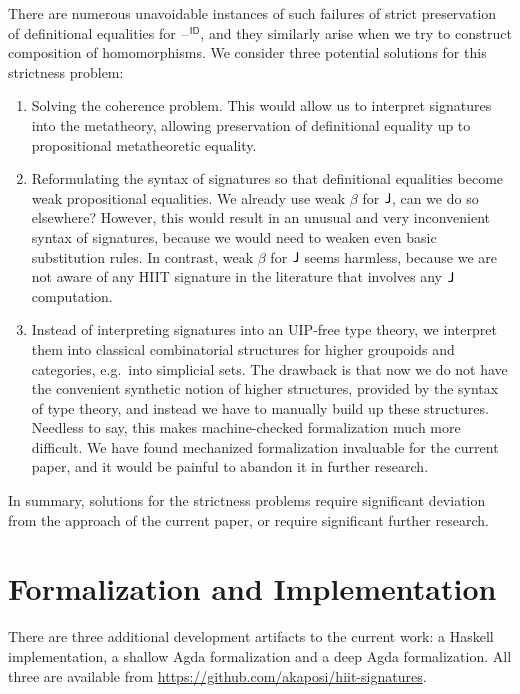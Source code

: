 \documentclass[dvipsnames]{lmcs} %
\newcommand{\blank}{\mathord{\hspace{1pt}\text{--}\hspace{1pt}}}
\newcommand{\1}{\mathsf{1}} \renewcommand{\Pr}{\mathsf{Pr}}
\theoremstyle{plain}\newtheorem{satz}[thm]{Satz} %
\begin{document}
There are numerous unavoidable instances of such failures of strict preservation
of definitional equalities for $\blank^{\mathsf{ID}}$, and they similarly arise when we
try to construct composition of homomorphisms. We consider three potential
solutions for this strictness problem:
\begin{enumerate}
\item Solving the coherence problem. This would allow us to interpret signatures
      into the metatheory, allowing preservation of definitional equality up
      to propositional metatheoretic equality.
\item Reformulating the syntax of signatures so that definitional equalities
      become weak propositional equalities. We already use weak $\beta$ for $\mathsf{J}$,
      can we do so elsewhere? However, this would result in an unusual and very
      inconvenient syntax of signatures, because we would need to weaken even basic
      substitution rules. In contrast, weak $\beta$ for $\mathsf{J}$ seems harmless, because
      we are not aware of any HIIT signature in the literature that involves
      any $\mathsf{J}$ computation.
\item Instead of interpreting signatures into an UIP-free type theory, we
      interpret them into classical combinatorial structures for higher groupoids
      and categories, e.g.\ into simplicial sets. The drawback is that now we do not
      have the convenient synthetic notion of higher structures, provided by the syntax
      of type theory, and instead we have to manually build up these
      structures. Needless to say, this makes machine-checked formalization much
      more difficult. We have found mechanized formalization invaluable for the
      current paper, and it would be painful to abandon it in further research.
\end{enumerate}

In summary, solutions for the strictness problems require significant deviation
from the approach of the current paper, or require significant further research.



\section{Formalization and Implementation}
\label{sec:formalization}

There are three additional development artifacts to the current work: a Haskell
implementation, a shallow Agda formalization and a deep Agda formalization. All
three are available from \url{https://github.com/akaposi/hiit-signatures}.
\end{document}
